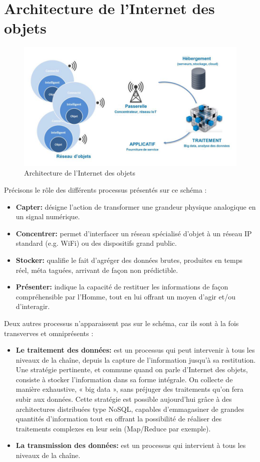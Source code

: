\section{Architecture de l’Internet des objets}

\begin{figure}[h]
	\centering
    \includegraphics[scale=0.5]{img/part1/2.2}
    \caption{Architecture de l’Internet des objets}
\end{figure}

Précisons le rôle des différents processus présentés sur ce schéma :
\begin{itemize}[label=\textbullet]
\item \textbf{Capter:} désigne l’action de transformer une grandeur physique analogique en un signal numérique.
\item \textbf{Concentrer:} permet d’interfacer un réseau spécialisé d’objet à un réseau IP standard (e.g. WiFi) ou des dispositifs grand public.
\item \textbf{Stocker:} qualifie le fait d’agréger des données brutes, produites en temps réel, méta taguées, arrivant de façon non prédictible.
\item \textbf{Présenter:} indique la capacité de restituer les informations de façon compréhensible par l’Homme, tout en lui offrant un moyen d’agir et/ou d’interagir.
\end{itemize}

Deux autres processus n’apparaissent pas sur le schéma, car ils sont à la fois transverves et omniprésents :
\begin{itemize}[label=\textbullet]
\item \textbf{Le traitement des données:} est un processus qui peut intervenir à tous les niveaux de la chaîne, depuis la capture de l’information jusqu’à sa restitution. Une stratégie pertinente, et commune quand on parle d’Internet des objets, consiste à stocker l’information dans sa forme intégrale. On collecte de manière exhaustive, « big data », sans préjuger des traitements qu’on fera subir aux données. Cette stratégie est possible aujourd’hui grâce à des architectures distribuées type NoSQL, capables d’emmagasiner de grandes quantités d’information tout en offrant la possibilité de réaliser des traitements complexes en leur sein (Map/Reduce par exemple).
\item \textbf{La transmission des données:} est un processus qui intervient à tous les niveaux de la chaîne.
\end{itemize}